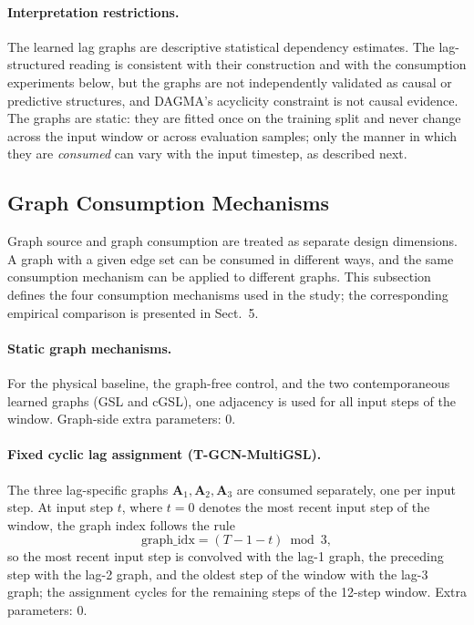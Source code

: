 \paragraph{Interpretation restrictions.}
The learned lag graphs are descriptive statistical dependency estimates. The
lag-structured reading is consistent with their construction and with the
consumption experiments below, but the graphs are not independently validated
as causal or predictive structures, and DAGMA's acyclicity constraint is not
causal evidence. The graphs are static: they are fitted once on the training
split and never change across the input window or across evaluation samples;
only the manner in which they are \emph{consumed} can vary with the input
timestep, as described next.

\subsection{Graph Consumption Mechanisms}\label{sec:consumption}

Graph source and graph consumption are treated as separate design dimensions.
A graph with a given edge set can be consumed in different ways, and the same
consumption mechanism can be applied to different graphs. This subsection
defines the four consumption mechanisms used in the study; the corresponding
empirical comparison is presented in Sect.~5.

\paragraph{Static graph mechanisms.}
For the physical baseline, the graph-free control, and the two contemporaneous
learned graphs (GSL and cGSL), one adjacency is used for all input steps of
the window. Graph-side extra parameters: $0$.

\paragraph{Fixed cyclic lag assignment (T-GCN-MultiGSL).}
The three lag-specific graphs $\mathbf{A}_1,\mathbf{A}_2,\mathbf{A}_3$ are
consumed separately, one per input step. At input step $t$, where $t=0$ denotes
the most recent input step of the window, the graph index follows the rule
\begin{equation}\label{eq:lagidx}
\mathrm{graph\_idx} = (T-1-t) \bmod 3,
\end{equation}
so the most recent input step is convolved with the lag-1 graph, the preceding
step with the lag-2 graph, and the oldest step of the window with the lag-3
graph; the assignment cycles for the remaining steps of the 12-step window.
Extra parameters: $0$.

